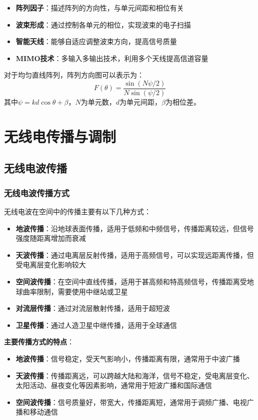 \documentclass[12pt,UTF8]{ctexbook}
\begin{document}
\begin{itemize}[leftmargin=3.5em]
    \item \textbf{阵列因子}：描述阵列的方向性，与单元间距和相位有关
    \item \textbf{波束形成}：通过控制各单元的相位，实现波束的电子扫描
    \item \textbf{智能天线}：能够自适应调整波束方向，提高信号质量
    \item \textbf{MIMO技术}：多输入多输出技术，利用多个天线提高信道容量
\end{itemize}

对于均匀直线阵列，阵列方向图可以表示为：
\[ F(\theta) = \frac{\sin(N\psi/2)}{N\sin(\psi/2)} \]
其中$\psi = kd\cos\theta + \beta$，$N$为单元数，$d$为单元间距，$\beta$为相位差。

\part{无线电传播与调制}

\chapter{无线电波传播}

\section{无线电波传播方式}

无线电波在空间中的传播主要有以下几种方式：

\begin{itemize}[leftmargin=3.5em]
    \item \textbf{地波传播}：沿地球表面传播，适用于低频和中频信号，传播距离较远，但信号强度随距离增加而衰减
    \item \textbf{天波传播}：通过电离层反射传播，适用于高频信号，可以实现远距离传播，但受电离层变化影响较大
    \item \textbf{空间波传播}：在空间中直线传播，适用于甚高频和特高频信号，传播距离受地球曲率限制，需要使用中继站或卫星
    \item \textbf{对流层传播}：通过对流层散射传播，适用于超短波
    \item \textbf{卫星传播}：通过人造卫星中继传播，适用于全球通信
\end{itemize}

\textbf{主要传播方式的特点}：
\begin{itemize}[leftmargin=3.5em]
    \item \textbf{地波传播}：信号稳定，受天气影响小，传播距离有限，通常用于中波广播
    \item \textbf{天波传播}：传播距离远，可以跨越大陆和海洋，信号不稳定，受电离层变化、太阳活动、昼夜变化等因素影响，通常用于短波广播和国际通信
    \item \textbf{空间波传播}：信号质量好，带宽大，传播距离短，通常用于调频广播、电视广播和移动通信
\end{itemize}
\end{document}
